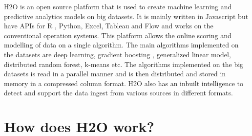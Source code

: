 \documentclass[9pt,twocolumn,twoside]{../../styles/osajnl}
\begin{document}
\cite{www-h2o-webpage}H2O \CE {} is an open source platform that
is used to create machine learning and predictive analytics models on
big datasets. It is mainly written in Javascript but have APIs for R ,
Python, Excel, Tableau and Flow and works on the conventional
operation systems.  This platform allows the online scoring and modelling of data
on a single algorithm.  The main algorithms implemented on the
datasets are deep learning, gradient boosting , generalized linear
model, distributed random forest, k-means etc. 
The algorithms implemented on the big datasets is read in a parallel
manner and is then distributed and stored in memory in a compressed
column format. H2O also has an inbuilt intelligence to detect and
support the data ingest \TE {} from various sources
in different formats.

\section{How does H2O work?}
\end{document}
